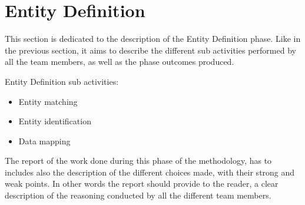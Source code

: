 \section{Entity Definition}

This section is dedicated to the description of the Entity Definition phase. Like in the previous section, it aims to describe the different sub activities performed by all the team members, as well as the phase outcomes produced. 


\noindent Entity Definition sub activities:
\begin{itemize}
        \item Entity matching
        \item Entity identification 
        \item Data mapping
\end{itemize}

\noindent The report of the work done during this phase of the methodology, has to includes also the description of the  different choices made, with their strong and weak points. In other words the report should provide to the reader, a clear description of the reasoning conducted by all the different team members.


